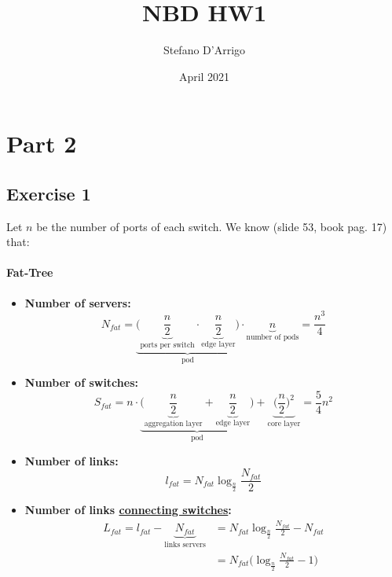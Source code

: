 \documentclass{article}
\title{NBD HW1}
\author{Stefano D'Arrigo}
\date{April 2021}
\begin{document}
\maketitle

\section{Part 2}
\subsection{Exercise 1}
Let $n$ be the number of ports of each switch. We know (slide 53, book pag. 17) that:
\paragraph{Fat-Tree}
\begin{itemize}
    \item \textbf{Number of servers:}
    \begin{equation}
        N_{fat} = \underbrace{\Big(\underbrace{\frac{n}{2}}_{\text{ports per switch}} \cdot \underbrace{\frac{n}{2}}_{\text{edge layer}}\Big)}_{\text{pod}} \cdot \underbrace{n}_{\text{number of pods}} = \frac{n^3}{4}
    \end{equation}
    \item \textbf{Number of switches:}
    \begin{equation}
        S_{fat} = n \cdot \underbrace{\Big(\underbrace{\frac{n}{2}}_{\text{aggregation layer}} + \underbrace{\frac{n}{2}}_{\text{edge layer}}\Big)}_{\text{pod}} 
        + \underbrace{\Big(\frac{n}{2}\Big)^2}_{\text{core layer}} = \frac{5}{4}n^2
    \end{equation}
    \item \textbf{Number of links:}
    \begin{equation}
        l_{fat} = N_{fat} \log_{\frac{n}{2}} \frac{N_{fat}}{2}
    \end{equation}
    \item \textbf{Number of links \underline{connecting switches}:}
    \begin{equation}
        \begin{split}
            L_{fat} = l_{fat} - \underbrace{N_{fat}}_{\text{links servers}} &= N_{fat} \log_{\frac{n}{2}} \frac{N_{fat}}{2} - N_{fat} \\ &= N_{fat} \Big(\log_{\frac{n}{2}} \frac{N_{fat}}{2} - 1\Big)
        \end{split}
    \end{equation}
\end{itemize}
\end{document}
